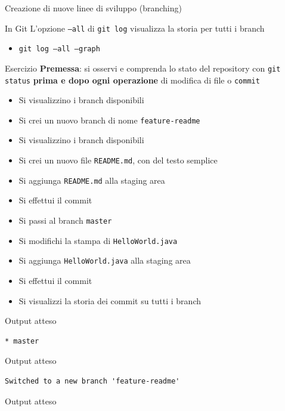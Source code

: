 \documentclass[xcolor=dvipsnames,presentation]{beamer}
\begin{document}
\begin{frame}{Creazione di nuove linee di sviluppo (branching)}
\begin{block}{In Git}
        L'opzione \texttt{--all} di \texttt{git log} visualizza la storia per tutti i branch
        \begin{itemize}
            \item \texttt{git log --all --graph}
        \end{itemize}
    \end{block}
    \begin{block}{Esercizio}
        \textbf{Premessa}: si osservi e comprenda lo stato del repository con \texttt{git status} \textbf{prima e dopo ogni operazione} di modifica di file o \texttt{commit}
        \begin{itemize}
            \footnotesize
            \item Si visualizzino i branch disponibili
            \item Si crei un nuovo branch di nome \texttt{feature-readme}
            \item Si visualizzino i branch disponibili
            \item Si crei un nuovo file \texttt{README.md}, con del testo semplice
            \item Si aggiunga \texttt{README.md} alla staging area
            \item Si effettui il commit
            \item Si passi al branch \texttt{master}
            \item Si modifichi la stampa di \texttt{HelloWorld.java}
            \item Si aggiunga \texttt{HelloWorld.java} alla staging area
            \item Si effettui il commit
            \item Si visualizzi la storia dei commit su tutti i branch
        \end{itemize}
    \end{block}
    \begin{block}{Output atteso}
        \begin{Verbatim}[fontsize=\scriptsize]
* master
        \end{Verbatim}
    \end{block}
    \begin{block}{Output atteso}
        \begin{Verbatim}[fontsize=\scriptsize]
Switched to a new branch 'feature-readme'
        \end{Verbatim}
    \end{block}
    \begin{block}{Output atteso}

\end{block}
\end{frame}
\end{document}
